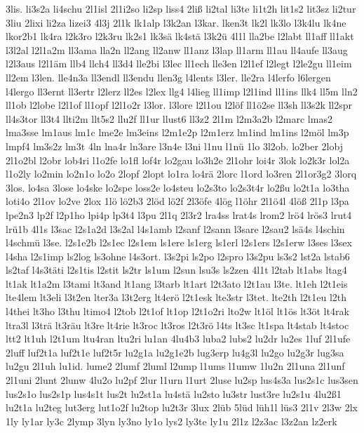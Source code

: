 {3lis.
li3s2a
li4schu
2l1isl
2l1i2so
li2sp
liss4
2liß
li2tal
li3te
li1t2h
lit1s2
lit3sz
li2tur
3liu
2lixi
li2za
lizei3
4l3j
2l1k
lk1alp
l3k2an
l3kar.
lken3t
lk2l
lk3lo
l3k4lu
lk4ne
lkor2b1
lk4ra
l2k3ro
l2k3ru
lk2s1
lk3sä
lk4stä
l3k2ü
4l1l
lla2be
l2labt
ll1aff
ll1akt
l3l2al
l2l1a2m
ll3ama
lla2n
ll2ang
ll2anw
ll1anz
l3lap
ll1arm
ll1au
ll4aufe
ll3aug
l2l3aus
l2l1äm
llb4
llch4
ll3d4
lle2bi
l3lec
ll1ech
lle3en
l2l1ef
l2legt
l2le2gu
ll1eim
ll2em
l3len.
lle4n3a
ll3endl
ll3endu
llen3g
l4lents
l3ler.
lle2ra
l4lerfo
l6lergen
l4lergo
ll3ernt
ll3ertr
l2lerz
ll2es
l2lex
llg4
l4lieg
ll1imp
l2l1ind
ll1ins
llk4
ll5m
lln2
ll1ob
l2lobe
l2l1of
ll1opf
l2l1o2r
l3lor.
l3lore
l2l1ou
l2löf
ll1ö2se
ll3sh
ll3s2k
ll2spr
ll4s3tor
ll3t4
llti2m
llt5s2
llu2f
ll1ur
llust6
ll3z2
2l1m
l2m3a2b
l2marc
lmas2
lma3sse
lm1aus
lm1c
lme2e
lm3eins
l2m1e2p
l2m1erz
lm1ind
lm1ins
l2möl
lm3p
lmpf4
lm3s2z
lm3t
4ln
lna4r
ln3are
l3n4e
l3ni
l1nu
l1nü
1lo
3l2ob.
lo2ber
2lobj
2l1o2bl
l2obr
lob4ri
l1o2fe
lo1fl
lof4r
lo2gau
lo3h2e
2l1ohr
loi4r
3lok
lo2k3r
lol2a
l1o2ly
lo2min
lo2n1o
lo2o
2lopf
2lopt
lo1ra
lo4rä
2lorc
l1ord
lo3ren
2l1or3g2
3lorq
3los.
lo4sa
3lose
lo4ske
lo2spe
loss2e
lo4steu
lo2s3to
lo2s3t4r
lo2ßu
lo2t1a
lo3tha
loti4o
2l1ov
lo2ve
2lox
1lö
lö2b3
2löd
lö2f
2l3öfe
4lög
l1öhr
2l1ö4l
4löß
2l1p
l3pa
lpe2n3
lp2f
l2p1ho
lpi4p
lp3t4
l3pu
2l1q
2l3r2
lra4ss
lrat4s
lrom2
lrö4
lrös3
lrut4
lrü1b
4l1s
l3sac
l2s1a2d
l3s2al
l4s1amb
l2sanf
l2sann
l3sare
l2sau2
lsä4s
l4schin
l4schmü
l3se.
l2s1e2b
l2s1ec
l2s1em
ls1ere
ls1erg
ls1erl
l2s1ers
l2s1erw
l3ses
l3sex
l4sha
l2s1imp
ls2log
ls3ohne
l4s3ort.
l3s2pi
ls2po
l2spro
l3s2pu
ls3s2
lst2a
lstab6
ls2taf
l4s3täti
l2s1tis
l2stit
ls2tr
ls1um
l2sun
lsu3s
ls2zen
4l1t
l2tab
lt1abs
ltag4
lt1ak
lt1a2m
l3tami
lt3and
lt1ang
l3tarb
lt1art
l2t3ato
l2t1au
l3te.
lt1eh
l2t1eis
lte4lem
lt3eli
l3t2en
lter3a
l3t2erg
lt4erö
l2t1esk
lte3str
l3tet.
lte2th
l2t1eu
l2th
l4thei
lt3ho
l3thu
ltimo4
l2tob
l2t1of
lt1op
l2t1o2ri
lto2w
lt1öl
lt1ös
lt3öt
lt4rak
ltra3l
l3trä
lt3räu
lt3re
lt4rie
lt3roc
lt3ros
l2t3rö
l4ts
lt3sc
lt1spa
lt4stab
lt4stoc
ltt2
lt1uh
l2t1um
ltu4ran
ltu2ri
lu1an
4lu4b3
luba2
lubs2
lu2dr
lu2es
1luf
2l1ufe
2luff
luf2t1a
luf2t1e
luf2t5r
lu2g1a
lu2g1e2b
lug3erp
lu4g3l
lu2go
lu2g3r
lug3sa
lu2gu
2l1uh
lu1id.
lume2
2lumf
2luml
l2ump
l1ums
l1umw
1lu2n
2l1una
2l1unf
2l1uni
2lunt
2lunw
4lu2o
lu2pf
2lur
l1urn
l1urt
2luse
lu2sp
lus4s3a
lus2s1c
lus3sen
lus2s1o
lus2s1p
lus4s1t
lus2t
lu2st1a
lu4stä
lu2sto
lu3str
lust3re
lu2s1u
4lu2ß1
lu2t1a
lu2teg
lut3erg
lut1o2f
lu2top
lu2t3r
3lux
2lüb
5lüd
lüh1l
lüs3
2l1v
2l3w
2lx
1ly
ly1ar
ly3c
2lymp
3lyn
ly3no
ly1o
lys2
ly3te
ly1u
2l1z
l2z3ac
l3z2an
lz2erk
}
